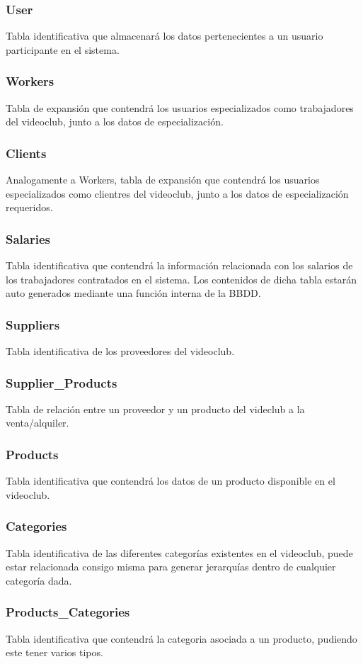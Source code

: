 \documentclass{article}
\begin{document}
\subsubsection{User}
Tabla identificativa que almacenará los datos pertenecientes a un usuario participante en el sistema.
\subsubsection{Workers}
Tabla de expansión que contendrá los usuarios especializados como trabajadores del videoclub, junto a los datos de especialización.
\subsubsection{Clients}
Analogamente a Workers, tabla de expansión que contendrá los usuarios especializados como clientres del videoclub, junto a los datos de especialización requeridos.
\subsubsection{Salaries}
Tabla identificativa que contendrá la información relacionada con los salarios de los trabajadores contratados en el sistema. Los contenidos de dicha tabla estarán auto generados mediante una función interna de la BBDD.
\subsubsection{Suppliers}
Tabla identificativa de los proveedores del videoclub.
\subsubsection{Supplier\_Products}
Tabla de relación entre un proveedor y un producto del videclub a la venta/alquiler.
\subsubsection{Products}
Tabla identificativa que contendrá los datos de un producto disponible en el videoclub.
\subsubsection{Categories}
Tabla identificativa de las diferentes categorías existentes en el videoclub, puede estar relacionada consigo misma para generar jerarquías dentro de cualquier categoría dada.
\subsubsection{Products\_Categories}
Tabla identificativa que contendrá la categoria asociada a un producto, pudiendo este tener varios tipos.
\end{document}
